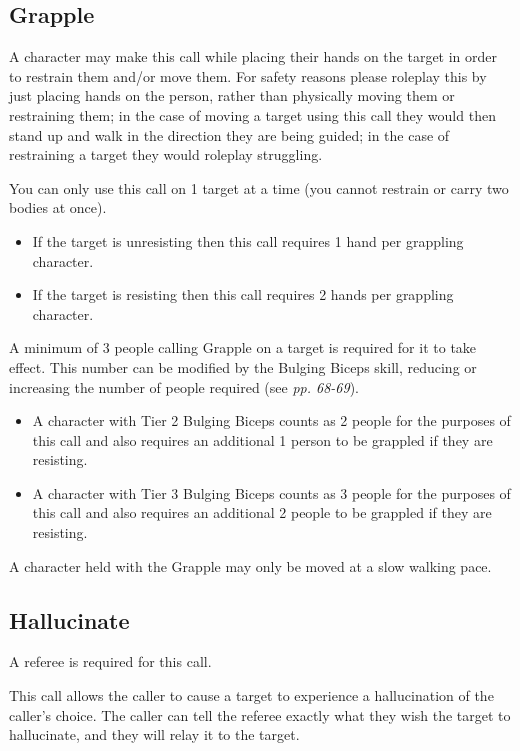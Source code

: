\subsection{Grapple}

A character may make this call while placing their hands on the target in order to restrain them and/or move them. For safety reasons please roleplay this by just placing hands on the person, rather than physically moving them or restraining them; in the case of moving a target using this call they would then stand up and walk in the direction they are being guided; in the case of restraining a target they would roleplay struggling.

You can only use this call on 1 target at a time (you cannot restrain or carry two bodies at once).

\begin{itemize}
\item If the target is unresisting then this call requires 1 hand per grappling character.

\item If the target is resisting then this call requires 2 hands per grappling character.

\end{itemize}
A minimum of 3 people calling Grapple on a target is required for it to take effect. This number can be modified by the Bulging Biceps skill, reducing or increasing the number of people required (see \textit{pp. 68-69}).

\begin{itemize}
\item A character with Tier 2 Bulging Biceps counts as 2 people for the purposes of this call and also requires an additional 1 person to be grappled if they are resisting.

\item A character with Tier 3 Bulging Biceps counts as 3 people for the purposes of this call and also requires an additional 2 people to be grappled if they are resisting.

\end{itemize}
A character held with the Grapple may only be moved at a slow walking pace.

\subsection{Hallucinate}

A referee is required for this call.

This call allows the caller to cause a target to experience a hallucination of the caller's choice. The caller can tell the referee exactly what they wish the target to hallucinate, and they will relay it to the target.

